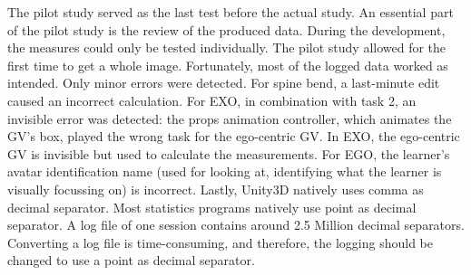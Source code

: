 The pilot study served as the last test before the actual study. An essential part of the pilot study is the review of the produced data. During the development, the measures could only be tested individually. The pilot study allowed for the first time to get a whole image. Fortunately, most of the logged data worked as intended. Only minor errors were detected. For spine bend, a last-minute edit caused an incorrect calculation. For EXO, in combination with task 2, an invisible error was detected: the props animation controller, which animates the GV's box, played the wrong task for the ego-centric GV. In EXO, the ego-centric GV is invisible but used to calculate the measurements. For EGO, the learner's avatar identification name (used for looking at, identifying what the learner is visually focussing on) is incorrect. Lastly, Unity3D natively uses comma as decimal separator. Most statistics programs natively use point as decimal separator. A log file of one session contains around 2.5 Million decimal separators. Converting a log file is time-consuming, and therefore, the logging should be changed to use a point as decimal separator.

